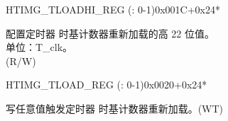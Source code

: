 \begin{register}{H}{TIMG\_TLOADHI\_REG (: 0-1)}{0x001C+0x24*}\label{regdesc:TIMGTXLOADHIREG}
%
%
\regnewline%
\begin{regdesc}\begin{reglist}
\label{fielddesc:TIMGTXLOADHI}\item [TIMG\_T\regindex{x}\_LOAD\_HI] 配置定时器  时基计数器重新加载的高 22 位值。\\
单位：T\_clk。 \\ (R/W)
\end{reglist}\end{regdesc}
\end{register}


\begin{register}{H}{TIMG\_TLOAD\_REG (: 0-1)}{0x0020+0x24*}\label{regdesc:TIMGTXLOADREG}
%
\regnewline%
\begin{regdesc}\begin{reglist}
\label{fielddesc:TIMGTXLOAD}\item [TIMG\_T\regindex{x}\_LOAD] 写任意值触发定时器  时基计数器重新加载。(WT)
\end{reglist}\end{regdesc}
\end{register}


